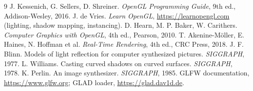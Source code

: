 \begin{thebibliography}{9}
 J. Kessenich, G. Sellers, D. Shreiner. \emph{OpenGL Programming Guide}, 9th ed., Addison-Wesley, 2016.
 J. de Vries. \emph{Learn OpenGL}, \url{https://learnopengl.com} (lighting, shadow mapping, instancing).
 D. Hearn, M. P. Baker, W. Carithers. \emph{Computer Graphics with OpenGL}, 4th ed., Pearson, 2010.
 T. Akenine-M\"oller, E. Haines, N. Hoffman et al. \emph{Real-Time Rendering}, 4th ed., CRC Press, 2018.
 J. F. Blinn. Models of light reflection for computer synthesized pictures. \emph{SIGGRAPH}, 1977.
 L. Williams. Casting curved shadows on curved surfaces. \emph{SIGGRAPH}, 1978.
 K. Perlin. An image synthesizer. \emph{SIGGRAPH}, 1985.
 GLFW documentation, \url{https://www.glfw.org}; GLAD loader, \url{https://glad.dav1d.de}.
\end{thebibliography}
